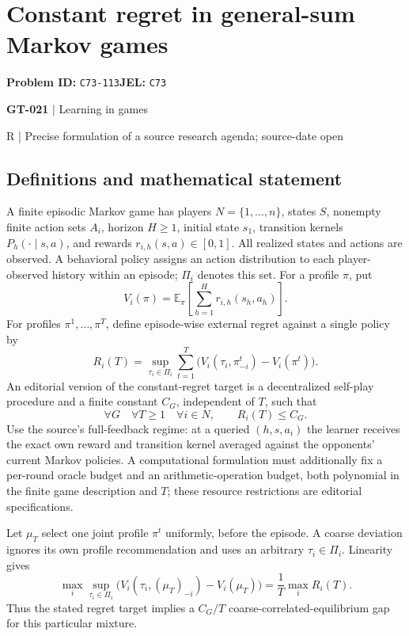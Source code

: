 \documentclass[11pt,a4paper]{article}
\begin{document}
\section*{Constant regret in general-sum Markov games}
\textbf{Problem ID:} \texttt{C73-113}\quad \textbf{JEL:} \texttt{C73}\par
\label{problem:OP-0151}
\label{game:GT-021}
{\sffamily\small\color{muted}
{\sffamily\small\color{muted}\textbf{GT-021} | Learning in games\par R | Precise formulation of a source research agenda; source-date open\par}
\par}
\subsection*{Definitions and mathematical statement}
A finite episodic Markov game has players $N=\{1,\ldots,n\}$, states $S$, nonempty finite action sets $A_i$, horizon $H\geq1$, initial state $s_1$, transition kernels $P_h(\cdot\mid s,a)$, and rewards $r_{i,h}(s,a)\in[0,1]$. All realized states and actions are observed. A behavioral policy assigns an action distribution to each player-observed history within an episode; $\Pi_i$ denotes this set. For a profile $\pi$, put
\[
 V_i(\pi)=\mathbb E_{\pi}\!\left[\sum_{h=1}^{H}r_{i,h}(s_h,a_h)\right].
\]
For profiles $\pi^1,\ldots,\pi^T$, define episode-wise external regret against a single policy by
\[
 R_i(T)=\sup_{\tau_i\in\Pi_i}\sum_{t=1}^{T}
 \bigl(V_i(\tau_i,\pi^t_{-i})-V_i(\pi^t)\bigr).
\]
An editorial version of the constant-regret target is a decentralized self-play procedure and a finite constant $C_G$, independent of $T$, such that
\[
 \forall G\quad\forall T\geq1\quad\forall i\in N,\qquad R_i(T)\leq C_G.
\]
Use the source's full-feedback regime: at a queried $(h,s,a_i)$ the learner receives the exact own reward and transition kernel averaged against the opponents' current Markov policies. A computational formulation must additionally fix a per-round oracle budget and an arithmetic-operation budget, both polynomial in the finite game description and $T$; these resource restrictions are editorial specifications.

Let $\mu_T$ select one joint profile $\pi^t$ uniformly, before the episode. A coarse deviation ignores its own profile recommendation and uses an arbitrary $\tau_i\in\Pi_i$. Linearity gives
\[
 \max_i\sup_{\tau_i\in\Pi_i}
 \bigl(V_i(\tau_i,(\mu_T)_{-i})-V_i(\mu_T)\bigr)
 =\frac1T\max_i R_i(T).
\]
Thus the stated regret target implies a $C_G/T$ coarse-correlated-equilibrium gap for this particular mixture.
\end{document}
